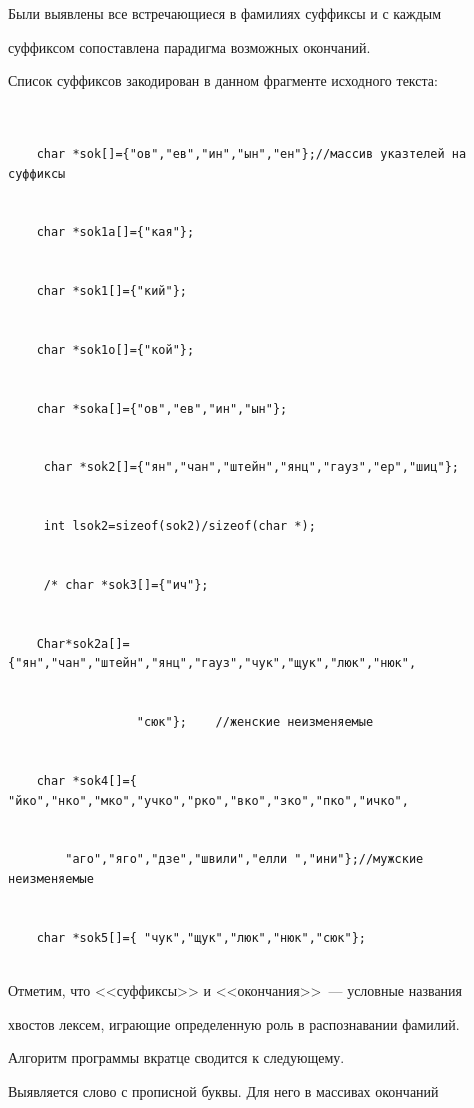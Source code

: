    


   Были выявлены все встречающиеся в фамилиях суффиксы и с каждым 


суффиксом сопоставлена парадигма возможных окончаний.


   


   Список суффиксов закодирован в данном фрагменте исходного текста:


   {\footnotesize


   \begin{verbatim}


    char *sok[]={"ов","ев","ин","ын","ен"};//массив указтелей на суффиксы


    char *sok1a[]={"кая"};


    char *sok1[]={"кий"};


    char *sok1o[]={"кой"};


    char *soka[]={"ов","ев","ин","ын"};


     char *sok2[]={"ян","чан","штейн","янц","гауз","ер","шиц"};


     int lsok2=sizeof(sok2)/sizeof(char *);


     /* char *sok3[]={"ич"};


    Char*sok2a[]={"ян","чан","штейн","янц","гауз","чук","щук","люк","нюк",


                  "сюк"};    //женские неизменяемые


    char *sok4[]={ "йко","нко","мко","учко","рко","вко","зко","пко","ичко",


        "аго","яго","дзе","швили","елли ","ини"};//мужские неизменяемые


    char *sok5[]={ "чук","щук","люк","нюк","сюк"};


   \end{verbatim}


   }


   


   Отметим, что <<суффиксы>> и <<окончания>>~--- условные названия 


хвостов лексем, играющие определенную роль в распознавании фамилий.


   


   Алгоритм программы вкратце сводится к следующему.  


   


   Выявляется слово с прописной буквы. Для него в массивах окончаний 


